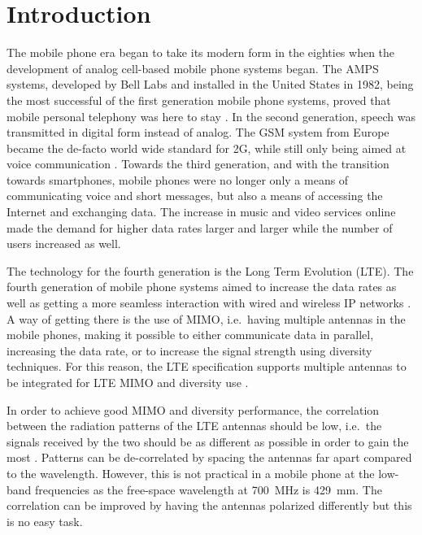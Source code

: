 \chapter{Introduction}
\label{cha:intro}

The mobile phone era began to take its modern form in the eighties when the development of analog cell-based mobile phone systems began. The AMPS systems, developed by Bell Labs and installed in the United States in 1982, being the most successful of the first generation mobile phone systems, proved that mobile personal telephony was here to stay \cite{tanenbaum2012computer}. In the second generation, speech was transmitted in digital form instead of analog. The GSM system from Europe became the de-facto world wide standard for 2G, while still only being aimed at voice communication \cite{tanenbaum2012computer}. Towards the third generation, and with the transition towards smartphones, mobile phones were no longer only a means of communicating voice and short messages, but also a means of accessing the Internet and exchanging data. The increase in music and video services online made the demand for higher data rates larger and larger while the number of users increased as well.

The technology for the fourth generation is the Long Term Evolution (LTE). The fourth generation of mobile phone systems aimed to increase the data rates as well as getting a more seamless interaction with wired and wireless IP networks \cite{tanenbaum2012computer}. A way of getting there is the use of MIMO, i.e.\ having multiple antennas in the mobile phones, making it possible to either communicate data in parallel, increasing the data rate, or to increase the signal strength using diversity techniques. For this reason, the LTE specification supports multiple antennas to be integrated for LTE MIMO and diversity use \cite{holma2011lte}.

In order to achieve good MIMO and diversity performance, the correlation between the radiation patterns of the LTE antennas should be low, i.e.\ the signals received by the two should be as different as possible in order to gain the most \cite{Tim2012Practical}. Patterns can be de-correlated by spacing the antennas far apart compared to the wavelength. However, this is not practical in a mobile phone at the low-band frequencies as the free-space wavelength at \SI{700}{MHz} is \SI{429}{mm}. The correlation can be improved by having the antennas polarized differently but this is no easy task.

